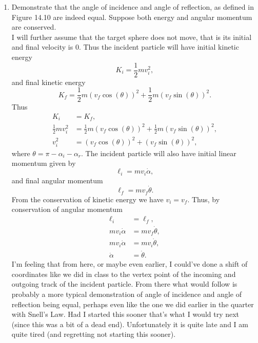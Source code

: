 \documentclass[a4paper, 12pt]{config/homework}
\begin{document}
\begin{enumerate}
\pagebreak
\item Demonstrate that the angle of incidence and angle of reflection, as defined in Figure 14.10 are indeed equal. Suppose both energy and angular momentum are conserved.
\\ I will further assume that the target sphere does not move, that is its initial and final velocity is 0. Thus the incident particle will have initial kinetic energy
\[K_i = \frac{1}{2}mv_i^2,\]
and final kinetic energy
\[K_f = \frac{1}{2}m(v_f \cos(\theta))^2 + \frac{1}{2}m(v_f \sin(\theta))^2.\]
Thus
\begin{align*}
K_i &= K_f,\\
\frac{1}{2}mv_i^2 &=  \frac{1}{2}m(v_f \cos(\theta))^2 + \frac{1}{2}m(v_f \sin(\theta))^2,\\
v_i^2 &= (v_f \cos(\theta))^2 + (v_f \sin(\theta))^2,
\end{align*}
where \(\theta = \pi - \alpha_i - \alpha_r\).
The incident particle will also have initial linear momentum given by
\[\ell_i = m v_i \dot{\alpha},\]
and final angular momentum
\[\ell_f = m v_f \dot{\theta}.\]
From the conservation of kinetic energy we have \(v_i = v_f\).
Thus, by conservation of angular momentum
\begin{align*}
\ell_i &= \ell_f,\\
m v_i \dot{\alpha} &= m v_f \dot{\theta},\\
m v_i \dot{\alpha} &= m v_i \dot{\theta},\\
\dot{\alpha} &= \dot{\theta}.
\end{align*}
I'm feeling that from here, or maybe even earlier, I could've done a shift of coordinates like we did in class to the vertex point of the incoming and outgoing track of the incident particle. From there what would follow is probably a more typical demonstration of angle of incidence and angle of reflection being equal, perhaps even like the one we did earlier in the quarter with Snell's Law. Had I started this sooner that's what I would try next (since this was a bit of a dead end). Unfortunately it is quite late and I am quite tired (and regretting not starting this sooner).
\end{enumerate}
\end{document}

